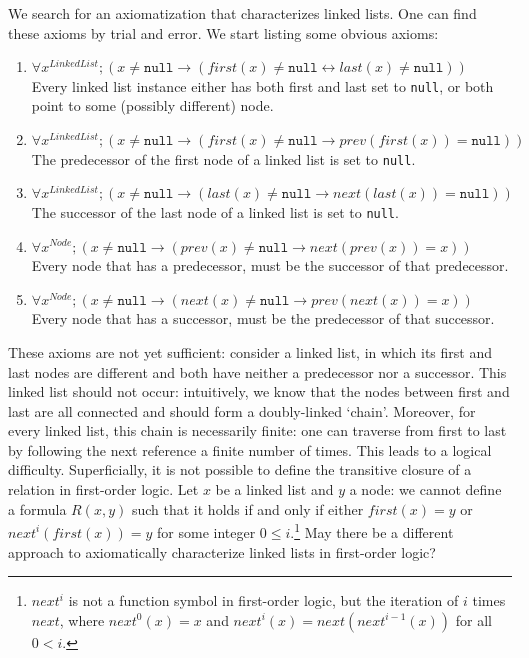 \documentclass[runningheads]{llncs}
\begin{document}
We search for an axiomatization that characterizes linked lists. One can find these axioms by trial and error. We start listing some obvious axioms:

\begin{enumerate}
    \item $\forall x^\mathit{LinkedList}; (x \neq \mathtt{null} \to (\mathit{first}(x) \neq \mathtt{null} \leftrightarrow \mathit{last}(x) \neq \mathtt{null}))$\\
    Every linked list instance either has both first and last set to \texttt{null}, or both point to some (possibly different) node.
    \item $\forall x^\mathit{LinkedList}; (x \neq \mathtt{null} \to (\mathit{first}(x) \neq \mathtt{null} \to \mathit{prev}(\mathit{first}(x)) = \mathtt{null}))$\\
    The predecessor of the first node of a linked list is set to \texttt{null}.
    \item\label{item:axiom-last} $\forall x^\mathit{LinkedList}; (x \neq \mathtt{null} \to (\mathit{last}(x) \neq \mathtt{null} \to \mathit{next}(\mathit{last}(x)) = \mathtt{null}))$\\
    The successor of the last node of a linked list is set to \texttt{null}.
    \item\label{item:axiom-pred} $\forall x^\mathit{Node}; (x \neq \mathtt{null} \to (\mathit{prev}(x) \neq \mathtt{null} \to \mathit{next}(\mathit{prev}(x)) = x))$\\
    Every node that has a predecessor, must be the successor of that predecessor.
    \item\label{item:axiom-succ} $\forall x^\mathit{Node}; (x \neq \mathtt{null} \to (\mathit{next}(x) \neq \mathtt{null} \to \mathit{prev}(\mathit{next}(x)) = x))$\\
    Every node that has a successor, must be the predecessor of that successor.
\end{enumerate}

These axioms are not yet sufficient: consider a linked list, in which its first and last nodes are different and both have neither a predecessor nor a successor. This linked list should not occur: intuitively, we know that the nodes between first and last are all connected and should form a doubly-linked `chain'. Moreover, for every linked list, this chain is necessarily finite: one can traverse from first to last by following the next reference a finite number of times. This leads to a logical difficulty. Superficially, it is not possible to define the transitive closure of a relation in first-order logic. Let $x$ be a linked list and $y$ a node: we cannot define a formula $R(x,y)$ such that it holds if and only if either $\mathit{first}(x)=y$ or $\mathit{next}^i(\mathit{first}(x))=y$ for some integer $0\leq i$.\footnote{$\mathit{next}^i$ is not a function symbol in first-order logic, but the iteration of $i$ times $\mathit{next}$, where $\mathit{next}^0(x)=x$ and $\mathit{next}^i(x)=next(\mathit{next}^{i-1}(x))$ for all $0<i$.} May there be a different approach to axiomatically characterize linked lists in first-order logic?
\end{document}
